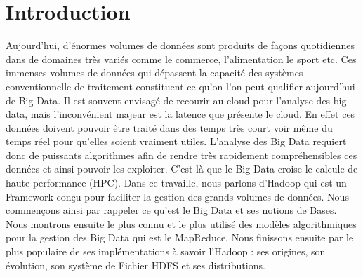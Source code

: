 \section{Introduction}
Aujourd’hui, d’énormes volumes de données sont produits de façons quotidiennes dans de domaines très variés comme le commerce, l’alimentation le sport etc. Ces immenses volumes de données qui dépassent la capacité des systèmes conventionnelle de traitement constituent ce qu’on l’on peut qualifier aujourd’hui de Big Data. Il est souvent envisagé de recourir au cloud pour l’analyse des big data, mais l’inconvénient majeur est la latence que présente le cloud. En effet ces données doivent pouvoir être traité dans des temps très court voir même du temps réel pour qu’elles soient vraiment utiles. L’analyse des Big Data requiert donc de puissants algorithmes afin de rendre très rapidement compréhensibles ces données et ainsi pouvoir les exploiter. C’est là que le Big Data croise le calcule de haute performance (HPC).\cite{odriscoll_big_2013} Dans ce travaille, nous parlons d’Hadoop qui est un Framework conçu pour faciliter la gestion des grands volumes de données. Nous commençons ainsi par rappeler ce qu’est le Big Data et ses notions de Bases. Nous montrons ensuite le plus connu et le plus utilisé des modèles algorithmiques pour la gestion des Big Data qui est le MapReduce. Nous finissons ensuite par le plus populaire de ses implémentations à savoir l’Hadoop : ses origines, son évolution, son système de Fichier HDFS et ses distributions.